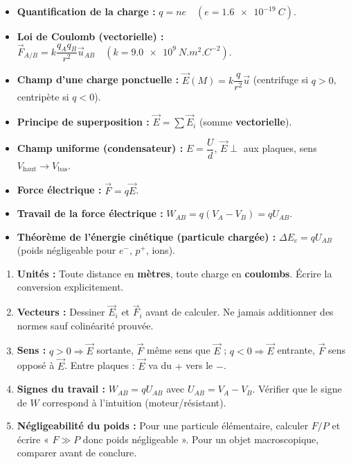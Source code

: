 \documentclass[11pt]{article}
\begin{document}
\begin{aretenir}
\begin{itemize}
\item \textbf{Quantification de la charge :} $q = n e \quad (e = \SI{1,6e-19}{C})$.
\item \textbf{Loi de Coulomb (vectorielle) :} $\vec{F}_{A/B} = k \dfrac{q_A q_B}{r^2} \vec{u}_{AB} \quad (k = \SI{9,0e9}{N.m^2.C^{-2}})$.
\item \textbf{Champ d'une charge ponctuelle :} $\vec{E}(M) = k \dfrac{q}{r^2} \vec{u}$ (centrifuge si $q>0$, centripète si $q<0$).
\item \textbf{Principe de superposition :} $\vec{E} = \sum \vec{E}_i$ (somme \textbf{vectorielle}).
\item \textbf{Champ uniforme (condensateur) :} $E = \dfrac{U}{d}$, $\vec{E} \perp$ aux plaques, sens $V_{\text{haut}} \to V_{\text{bas}}$.
\item \textbf{Force électrique :} $\vec{F} = q \vec{E}$.
\item \textbf{Travail de la force électrique :} $W_{AB} = q (V_A - V_B) = q U_{AB}$.
\item \textbf{Théorème de l'énergie cinétique (particule chargée) :} $\Delta E_c = q U_{AB}$ (poids négligeable pour $e^-$, $p^+$, ions).
\end{itemize}
\end{aretenir}

\begin{methode}
\begin{enumerate}
\item \textbf{Unités :} Toute distance en \textbf{mètres}, toute charge en \textbf{coulombs}. Écrire la conversion explicitement.
\item \textbf{Vecteurs :} Dessiner $\vec{E}_i$ et $\vec{F}_i$ avant de calculer. Ne jamais additionner des normes sauf colinéarité prouvée.
\item \textbf{Sens :} $q>0 \Rightarrow \vec{E}$ sortante, $\vec{F}$ même sens que $\vec{E}$ ; $q<0 \Rightarrow \vec{E}$ entrante, $\vec{F}$ sens opposé à $\vec{E}$. Entre plaques : $\vec{E}$ va du $+$ vers le $-$.
\item \textbf{Signes du travail :} $W_{AB} = q U_{AB}$ avec $U_{AB} = V_A - V_B$. Vérifier que le signe de $W$ correspond à l'intuition (moteur/résistant).
\item \textbf{Négligeabilité du poids :} Pour une particule élémentaire, calculer $F/P$ et écrire « $F \gg P$ donc poids négligeable ». Pour un objet macroscopique, comparer avant de conclure.
\end{enumerate}
\end{methode}
\end{document}
